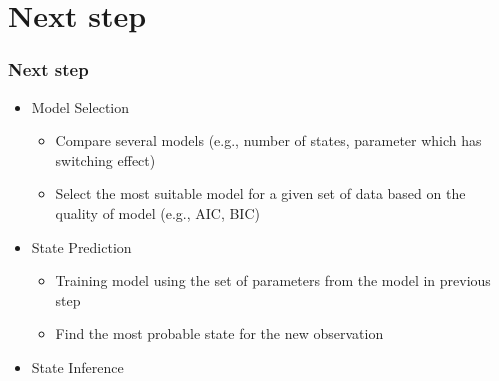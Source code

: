 \documentclass{beamer}
\begin{document}
\section{Next step}
\begin{frame}
\frametitle{Next step}
\begin{itemize}
	\item Model Selection
	\begin{itemize}
		\item Compare several models (e.g., number of states, parameter which has switching effect)
		\item Select the most suitable model for a given set of data based on the quality of model (e.g., AIC, BIC)
	\end{itemize}
	\item State Prediction
	\begin{itemize}
		\item Training model using the set of parameters from the model in previous step
		\item Find the most probable state for the new observation
	\end{itemize}
	\item State Inference

\end{itemize}
\end{frame}
\end{document}
